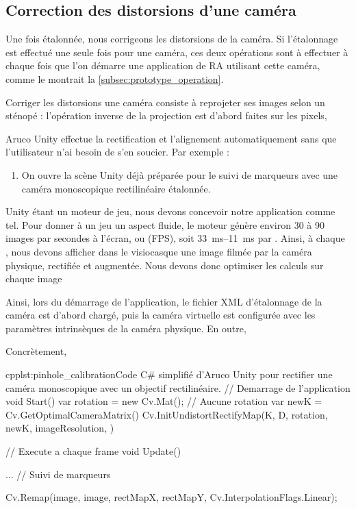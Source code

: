 \subsection{Correction des distorsions d'une caméra}
\label{subsec:pinhole_camera_undistortion}
Une fois étalonnée, nous corrigeons les distorsions de la caméra. Si l'étalonnage est effectué une seule fois pour une caméra, ces deux opérations sont à effectuer à chaque fois que l'on démarre une application de RA utilisant cette caméra, comme le montrait la \autoref{subsec:prototype_operation}.

Corriger les distorsions une caméra consiste à reprojeter ses images selon un sténopé : l'opération inverse de la projection est d'abord faites sur les pixels, 


Aruco Unity effectue la rectification et l'alignement automatiquement sans que l'utilisateur n'ai besoin de s'en soucier. Par exemple :
\begin{enumerate}
  \item On ouvre la scène Unity  déjà préparée pour le suivi de marqueurs avec une caméra monoscopique rectilinéaire étalonnée.
\end{enumerate}

Unity étant un moteur de jeu, nous devons concevoir notre application comme tel. Pour donner à un jeu un aspect fluide, le moteur génère environ 30 à 90 images par secondes à l'écran, ou  (FPS), soit \SIrange{33}{11}{\ms} par . Ainsi, à chaque , nous devons afficher dans le visiocasque une image filmée par la caméra physique, rectifiée et augmentée. Nous devons donc optimiser les calculs sur chaque image

Ainsi, lors du démarrage de l'application, le fichier XML d'étalonnage de la caméra est d'abord chargé, puis la caméra virtuelle est configurée avec les paramètres intrinsèques de la caméra physique. En outre, 

Concrètement, 

\begin{listingETS}{cpp}{lst:pinhole_calibration}{Code C\# simplifié d'Aruco Unity pour rectifier une caméra monoscopique avec un objectif rectilinéaire.}
  // Demarrage de l'application
  void Start()
  {
    var rotation = new Cv.Mat(); // Aucune rotation
    var newK = Cv.GetOptimalCameraMatrix()
    Cv.InitUndistortRectifyMap(K, D, rotation, newK, imageResolution, )
  }

  // Execute a chaque frame
  void Update()
  {
    ... // Suivi de marqueurs

    Cv.Remap(image, image, rectMapX, rectMapY, Cv.InterpolationFlags.Linear);
  }
\end{listingETS}

